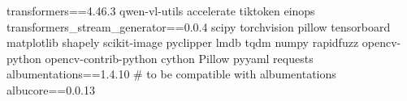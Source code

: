 transformers==4.46.3
qwen-vl-utils
accelerate
tiktoken
einops
transformers_stream_generator==0.0.4
scipy
torchvision
pillow
tensorboard
matplotlib
shapely
scikit-image
pyclipper
lmdb
tqdm
numpy
rapidfuzz
opencv-python
opencv-contrib-python
cython
Pillow
pyyaml
requests
albumentations==1.4.10
# to be compatible with albumentations
albucore==0.0.13